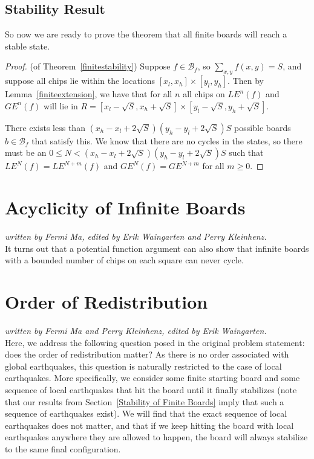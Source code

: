 \documentclass[runningheads,a4paper]{llncs}
\begin{document}
\subsection{Stability Result}
So now we are ready to prove the theorem that all finite boards will reach a stable state. 

\begin{proof}
(of Theorem~\ref{finitestability}) Suppose $f \in \mathcal{B}_f$, so $\sum_{x,y} f(x,y) = S$, and suppose all chips lie within the locations $[x_l, x_h] \times [y_l, y_h]$. Then by Lemma~\ref{finiteextension}, we have that for all $n$ all chips on $LE^n(f)$ and $GE^n(f)$ will lie in $R = [x_l - \sqrt{S}, x_h + \sqrt{S}] \times [y_l - \sqrt{S}, y_h + \sqrt{S}]$. 

There exists less than $(x_h - x_l + 2\sqrt{S})(y_h - y_l + 2\sqrt{S})S$ possible boards $b \in \mathcal{B}_f$ that satisfy this. We know that there are no cycles in the states, so there must be an $0 \leq N < (x_h - x_l + 2\sqrt{S})(y_h - y_l + 2\sqrt{S})S$ such that $LE^N(f) = LE^{N+m}(f)$ and $GE^N(f)=GE^{N+m}$ for all $m \geq 0$.
\end{proof}

\section{Acyclicity of Infinite Boards}
\label{Acyclicity of Infinite Boards}

\emph{written by Fermi Ma, edited by Erik Waingarten and Perry Kleinhenz.}\\

It turns out that a potential function argument can also show that infinite boards with a bounded number of chips on each square can never cycle.

\section{Order of Redistribution}
\label{Order of Redistribution}

\emph{written by Fermi Ma and Perry Kleinhenz, edited by Erik Waingarten.}\\

Here, we address the following question posed in the original problem statement: does the order of redistribution matter? As there is no order associated with global earthquakes, this question is naturally restricted to the case of local earthquakes. More specifically, we consider some finite starting board and some sequence of local earthquakes that hit the board until it finally stabilizes (note that our results from Section~\ref{Stability of Finite Boards} imply that such a sequence of earthquakes exist). We will find that the exact sequence of local earthquakes does not matter, and that if we keep hitting the board with local earthquakes anywhere they are allowed to happen, the board will always stabilize to the same final configuration.\\
\end{document}
